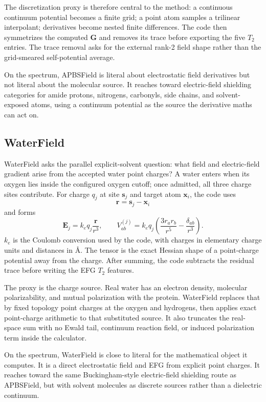 \documentclass[11pt]{article}
\begin{document}
The discretization proxy is therefore central to the method: a continuous
continuum potential becomes a finite grid; a point atom samples a trilinear
interpolant; derivatives become nested finite differences. The code then
symmetrizes the computed \(\bm G\) and removes its trace before exporting the
five \(T_2\) entries. The trace removal asks for the external rank-2 field
shape rather than the grid-smeared self-potential average.

On the spectrum, APBSField is literal about electrostatic field derivatives but
not literal about the molecular source. It reaches toward electric-field
shielding categories for amide protons, nitrogens, carbonyls, side chains, and
solvent-exposed atoms, using a continuum potential as the source the derivative
maths can act on.

\subsection{WaterField}

WaterField asks the parallel explicit-solvent question: what field and
electric-field gradient arise from the accepted water point charges? A water
enters when its oxygen lies inside the configured oxygen cutoff; once admitted,
all three charge sites contribute. For charge \(q_j\) at site \(\bm s_j\) and
target atom \(\bm x_i\), the code uses
\[
  \bm r=\bm s_j-\bm x_i
\]
and forms
\[
  \bm E_j =
  k_e q_j \frac{\bm r}{r^3},
  \qquad
  V^{(j)}_{ab}
  =
  k_e q_j
  \left(
    \frac{3r_a r_b}{r^5}
    -\frac{\delta_{ab}}{r^3}
  \right).
\]
\(k_e\) is the Coulomb conversion used by the code, with charges in elementary
charge units and distances in \(\si{\angstrom}\). The tensor is the exact
Hessian shape of a point-charge potential away from the charge. After summing,
the code subtracts the residual trace before writing the EFG \(T_2\) features.

The proxy is the charge source. Real water has an electron density, molecular
polarizability, and mutual polarization with the protein. WaterField replaces
that by fixed topology point charges at the oxygen and hydrogens, then applies
exact point-charge arithmetic to that substituted source. It also truncates the
real-space sum with no Ewald tail, continuum reaction field, or induced
polarization term inside the calculator.

On the spectrum, WaterField is close to literal for the mathematical object it
computes. It is a direct electrostatic field and EFG from explicit point
charges. It reaches toward the same Buckingham-style electric-field shielding
route as APBSField, but with solvent molecules as discrete sources rather than
a dielectric continuum.
\end{document}
